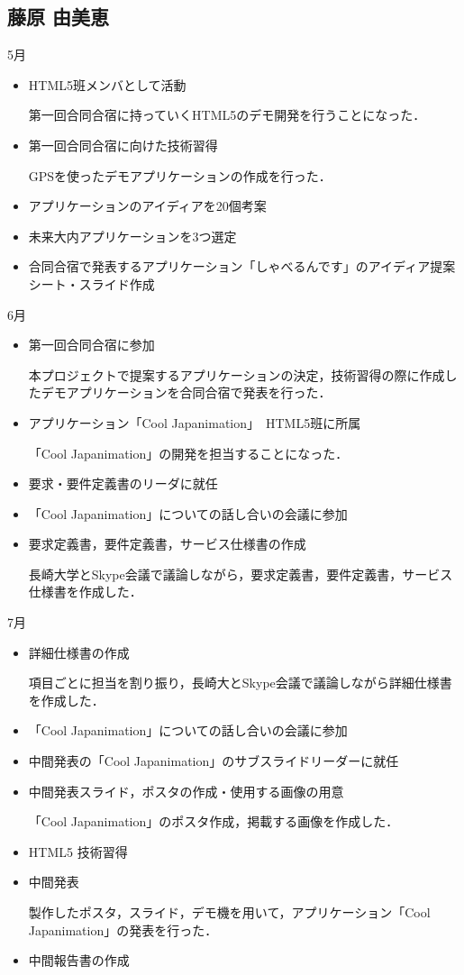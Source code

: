 \subsection{藤原 由美恵}
5月
\begin{itemize}
\item HTML5班メンバとして活動
\par 第一回合同合宿に持っていくHTML5のデモ開発を行うことになった．
\item 第一回合同合宿に向けた技術習得
\par GPSを使ったデモアプリケーションの作成を行った．
\item アプリケーションのアイディアを20個考案
\item 未来大内アプリケーションを3つ選定
\item 合同合宿で発表するアプリケーション「しゃべるんです」のアイディア提案シート・スライド作成
\end{itemize}
6月
\begin{itemize}
\item 第一回合同合宿に参加
\par 本プロジェクトで提案するアプリケーションの決定，技術習得の際に作成したデモアプリケーションを合同合宿で発表を行った．
\item アプリケーション「Cool Japanimation」　HTML5班に所属
\par 「Cool Japanimation」の開発を担当することになった．
\item 要求・要件定義書のリーダに就任
\item 「Cool Japanimation」についての話し合いの会議に参加
\item 要求定義書，要件定義書，サービス仕様書の作成
\par 長崎大学とSkype会議で議論しながら，要求定義書，要件定義書，サービス仕様書を作成した．
\end{itemize}
7月
\begin{itemize}
\item 詳細仕様書の作成
\par 項目ごとに担当を割り振り，長崎大とSkype会議で議論しながら詳細仕様書を作成した．
\item 「Cool Japanimation」についての話し合いの会議に参加
\item 中間発表の「Cool Japanimation」のサブスライドリーダーに就任
\item 中間発表スライド，ポスタの作成・使用する画像の用意
\par 「Cool Japanimation」のポスタ作成，掲載する画像を作成した．
\item HTML5 技術習得
\item 中間発表
\par 製作したポスタ，スライド，デモ機を用いて，アプリケーション「Cool Japanimation」の発表を行った．
\item 中間報告書の作成
\end{itemize}
